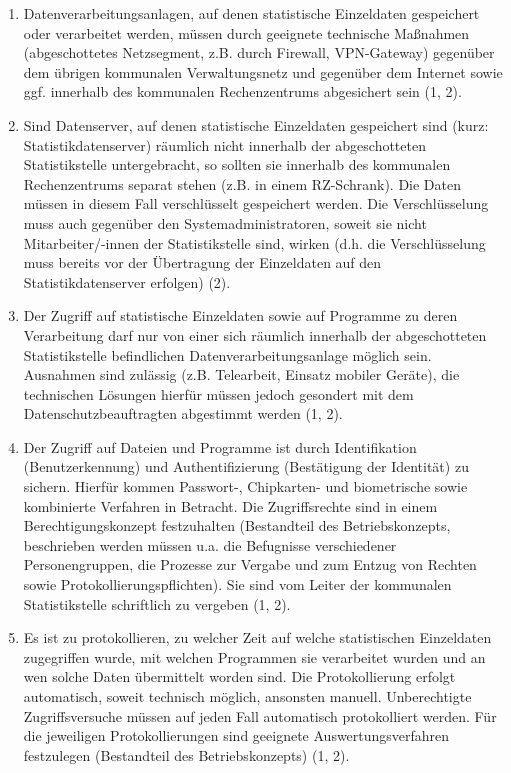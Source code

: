         \begin{enumerate}[label=\arabic*.]
            \item Datenverarbeitungsanlagen, auf denen statistische Einzeldaten gespeichert oder verarbeitet werden, müssen durch geeignete technische Maßnahmen (abgeschottetes Netzsegment, z.B. durch Firewall, VPN-Gateway) gegenüber dem übrigen kommunalen Verwaltungsnetz und gegenüber dem Internet sowie ggf. innerhalb des kommunalen Rechenzentrums abgesichert sein (1, 2).
            \item Sind Datenserver, auf denen statistische Einzeldaten gespeichert sind (kurz: Statistikdatenserver) räumlich nicht innerhalb der abgeschotteten Statistikstelle untergebracht, so sollten sie innerhalb des kommunalen Rechenzentrums separat stehen (z.B. in einem RZ-Schrank). Die Daten müssen in diesem Fall verschlüsselt gespeichert werden. Die Verschlüsselung muss auch gegenüber den Systemadministratoren, soweit sie nicht Mitarbeiter/-innen der Statistikstelle sind, wirken (d.h. die Verschlüsselung muss bereits vor der Übertragung der Einzeldaten auf den Statistikdatenserver erfolgen) (2).
            \item Der Zugriff auf statistische Einzeldaten sowie auf Programme zu deren Verarbeitung darf nur von einer sich räumlich innerhalb der abgeschotteten Statistikstelle befindlichen Datenverarbeitungsanlage möglich sein. Ausnahmen sind zulässig (z.B. Telearbeit, Einsatz mobiler Geräte), die technischen Lösungen hierfür müssen jedoch gesondert mit dem Datenschutzbeauftragten abgestimmt werden (1, 2).
            \item Der Zugriff auf Dateien und Programme ist durch Identifikation (Benutzerkennung) und Authentifizierung (Bestätigung der Identität) zu sichern. Hierfür kommen Passwort-, Chipkarten- und biometrische sowie kombinierte Verfahren in Betracht. Die Zugriffsrechte sind in einem Berechtigungskonzept festzuhalten (Bestandteil des Betriebskonzepts, beschrieben werden müssen u.a. die Befugnisse verschiedener Personengruppen, die Prozesse zur Vergabe und zum Entzug von Rechten sowie Protokollierungspflichten). Sie sind vom Leiter der kommunalen Statistikstelle schriftlich zu vergeben (1, 2).
            \item Es ist zu protokollieren, zu welcher Zeit auf welche statistischen Einzeldaten zugegriffen wurde, mit welchen Programmen sie verarbeitet wurden und an wen solche Daten übermittelt worden sind. Die Protokollierung erfolgt automatisch, soweit technisch möglich, ansonsten manuell. Unberechtigte Zugriffsversuche müssen auf jeden Fall automatisch protokolliert werden. Für die jeweiligen Protokollierungen sind geeignete Auswertungsverfahren festzulegen (Bestandteil des Betriebskonzepts) (1, 2).

\end{enumerate}
